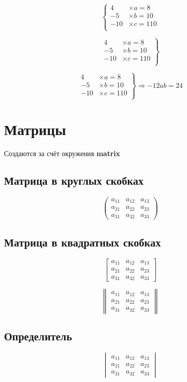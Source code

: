 \documentclass[12pt]{article}
\begin{document}
\[
  \left \{
    \begin{aligned}
      4 & \times a = 8 \\
      -5 & \times b = 10 \\
      -10 & \times c = 110 \\
    \end{aligned}
  \right.
\]

\[
  \left.
    \begin{aligned}
      4 & \times a = 8 \\
      -5 & \times b = 10 \\
      -10 & \times c = 110 \\
    \end{aligned}
  \right \}
\]

\[
  \left.
    \begin{aligned}
      4 & \times a = 8 \\
      -5 & \times b = 10 \\
      -10 & \times c = 110 \\
    \end{aligned}
  \right \} \Rightarrow -12ab = 24
\]

\section{Матрицы}
Создаются за счёт окружения \textbf{matrix}

\subsection{Матрица в круглых скобках}

\[
  \begin{pmatrix}
    a_{11} & a_{12} & a_{13} \\
    a_{21} & a_{22} & a_{23} \\
    a_{31} & a_{32} & a_{33}
  \end{pmatrix}
\]

\subsection{Матрица в квадратных скобках}

\[
  \begin{bmatrix}
    a_{11} & a_{12} & a_{13} \\
    a_{21} & a_{22} & a_{23} \\
    a_{31} & a_{32} & a_{33}
  \end{bmatrix}
\]

\[
  \begin{Vmatrix}
    a_{11} & a_{12} & a_{13} \\
    a_{21} & a_{22} & a_{23} \\
    a_{31} & a_{32} & a_{33}
  \end{Vmatrix}
\]

\subsection{Определитель}

\[
  \begin{vmatrix}
    a_{11} & a_{12} & a_{13} \\
    a_{21} & a_{22} & a_{23} \\
    a_{31} & a_{32} & a_{33}
  \end{vmatrix}
\]
\end{document}

